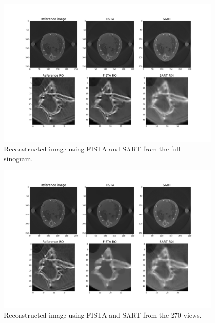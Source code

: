 \documentclass[12pt]{article}
\begin{document}
\begin{figure}[H]
	\centering
	\includegraphics[height=0.35\paperheight]{../results/comparisonFull.png}
	\caption{Reconstructed image using FISTA and SART from the full sinogram.}
	\label{fig:comparisonfull}
\end{figure}

\begin{figure}[H]
	\centering
	\includegraphics[height=0.35\paperheight]{../results/comparison270.png}
	\caption{Reconstructed image using FISTA and SART from the 270 views.}
	\label{fig:comparison270}
\end{figure}
\end{document}
